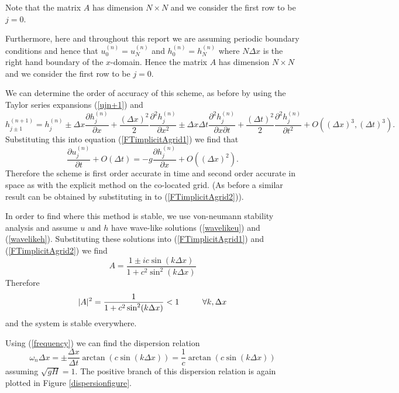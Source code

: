\documentclass[a4paper,12pt, notitlepage]{article}
\newcommand\tab[1][0.05cm]{\hspace*{#1}}
\begin{document}
Note that the matrix $A$ has dimension $N \times N$ and we consider the first row to be $j = 0$. 

Furthermore, here and throughout this report we are assuming periodic boundary conditions and hence that $u_{0}^{(n)} = u_{N}^{(n)}$ and $h_{0}^{(n)} = h_{N}^{(n)}$ where $N\Delta x$ is the right hand boundary of the $x$-domain. Hence the matrix $A$ has dimension $N \times N$ and we consider the first row to be $j = 0$. 


We can determine the order of accuracy of this scheme, as before by using the Taylor series expansions (\ref{ujn+1}) and
\begin{equation}
h_{j \pm 1}^{(n+1)} = h_{j}^{(n)} \pm \Delta x \frac{\partial h_{j}^{(n)}}{\partial x} + \frac{(\Delta x)^{2}}{2} \frac{\partial^{2}h_{j}^{(n)}}{\partial x^{2}} \pm \Delta x \Delta t \frac{\partial^{2}h_{j}^{(n)}}{\partial x\partial t} + \frac{(\Delta t)^{2}}{2}\frac{\partial^{2}h_{j}^{(n)}}{\partial t^{2}} + O((\Delta x)^{3}, {(\Delta t)^{3}}).
\end{equation}
Substituting this into equation (\ref{FTimplicitAgrid1}) we find that
\begin{equation}
\frac{\partial u_{j}^{(n)}}{\partial t} + O(\Delta t) = - g \frac{\partial h_{j}^{(n)}}{\partial x} + O((\Delta x)^{2}).
\end{equation}
Therefore the scheme is first order accurate in time and second order accurate in space as with the explicit method on the co-located grid. (As before a similar result can be obtained by substituting in to (\ref{FTimplicitAgrid2})).

In order to find where this method is stable, we use von-neumann stability analysis and assume $u$ and $h$ have wave-like solutions (\ref{wavelikeu}) and (\ref{wavelikeh}). Substituting these solutions into (\ref{FTimplicitAgrid1}) and (\ref{FTimplicitAgrid2}) we find
\begin{equation}
A = \frac{1 \pm i c\sin(k\Delta x)}{1 + c^{2}\sin^{2}(k\Delta x)}
\end{equation}
Therefore 
\begin{equation}
\lvert A \rvert ^{2} = \frac{1}{1 + c^{2}\sin^{2}(k\Delta x)} < 1  \tab[1cm] \forall k, \Delta x
\end{equation}
and the system is stable everywhere. 

Using (\ref{frequency}) we can find the dispersion relation
\begin{equation}
\omega_{n} \Delta x = \pm\frac{\Delta x}{\Delta t} \arctan(c\sin(k\Delta x)) = \frac{1}{c}  \arctan(c\sin(k\Delta x))
\end{equation}
assuming $\sqrt{gH} = 1$. The positive branch of this dispersion relation is again plotted in Figure \ref{dispersionfigure}.
\end{document}

